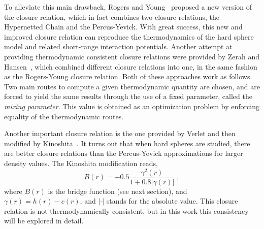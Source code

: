 To alleviate this main drawback, Rogers and Young~\cite{rogersNewThermodynamicallyConsistent1984b}
proposed a new version of the closure relation, which in fact combines two closure 
relations, the Hypernetted Chain and the Percus-Yevick. With great success, this new
and improved closure relation can reproduce the thermodynamics of the hard sphere model
and related short-range interaction potentials. Another attempt at providing thermodynamic
consistent closure relations were provided by Zerah and Hansen~\cite{zerahSelfConsistentIntegral1986},
which combined different closure relations into one, in the same fashion as the Rogers-Young
closure relation. Both of these approaches work as follows. Two main routes to compute a 
given thermodynamic quantity are chosen, and are forced to yield the same results through 
the use of a fixed parameter, called the \emph{mixing parameter}. This value is obtained as 
an optimization problem by enforcing equality of the thermodynamic routes.

Another important closure relation is the one provided by Verlet and then modified by
Kinoshita~\cite{kinoshitaInteractionSurfacesSolvophobicity2003}. It turns out that
when hard spheres are studied, there are better closure relations than the
Percus-Yevick approximations for larger density values.
The Kinoshita modification reads,
\begin{equation}
    B(r) = - 0.5 \frac{\gamma^2 (r)}{1 + 0.8 \lvert \gamma (r) \rvert} \; ,
    \label{eq:kinoshita}
\end{equation}
where $B(r)$ is the bridge function (see next section), and $\gamma(r)=h(r)-c(r)$,
and \(\lvert \cdot \rvert\) stands for the absolute value.
This closure relation is not thermodynamically consistent, but in this work this
consistency will be explored in detail.

